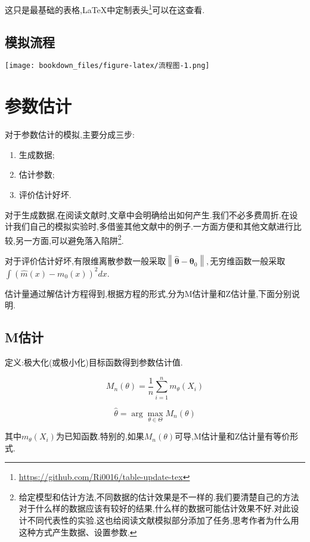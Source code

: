 \documentclass[]{ctexbook}
\providecommand{\tightlist}{%
  \setlength{\itemsep}{0pt}\setlength{\parskip}{0pt}}
\renewcommand{\href}[2]{#2\footnote{\url{#1}}}
\begin{document}
这只是最基础的表格,LaTeX中\href{https://github.com/Ri0016/table-update-tex}{定制表头}可以在这查看.

\hypertarget{section-8}{%
\section{模拟流程}\label{section-8}}

\texttt{[image: bookdown\_files/figure-latex/流程图-1.png]}

\hypertarget{section-9}{%
\chapter{参数估计}\label{section-9}}

对于参数估计的模拟,主要分成三步:

\begin{enumerate}
\def\labelenumi{\arabic{enumi}.}
\tightlist
\item
  生成数据;
\item
  估计参数;
\item
  评价估计好坏.
\end{enumerate}

对于生成数据,在阅读文献时,文章中会明确给出如何产生.我们不必多费周折.在设计我们自己的模拟实验时,多借鉴其他文献中的例子.一方面方便和其他文献进行比较,另一方面,可以避免落入陷阱\footnote{给定模型和估计方法,不同数据的估计效果是不一样的.我们要清楚自己的方法对于什么样的数据应该有较好的结果,什么样的数据可能估计效果不好.对此设计不同代表性的实验.这也给阅读文献模拟部分添加了任务,思考作者为什么用这种方式产生数据、设置参数.}.

对于评价估计好坏,有限维离散参数一般采取\(\left\|\hat{\boldsymbol{\theta}}-\boldsymbol{\theta}_{0}\right\|,\)无穷维函数一般采取\(\int\left(\hat{m}(x)-m_{0}(x)\right)^{2} d x.\)

估计量通过解估计方程得到,根据方程的形式,分为M估计量和Z估计量,下面分别说明.

\hypertarget{m}{%
\section{M估计}\label{m}}

定义:极大化(或极小化)目标函数得到参数估计值.

\[
M_{n}(\theta)=\frac{1}{n} \sum_{i=1}^{n} m_{\theta}\left(X_{i}\right)
\]

\[
\hat{\theta}=\arg \max_{\theta \in \Theta} M_{n}(\theta)
\]

其中\(m_{\theta}\left(X_{i}\right)\)为已知函数.特别的,如果\(M_n(\theta)\)可导,M估计量和Z估计量有等价形式.
\end{document}
